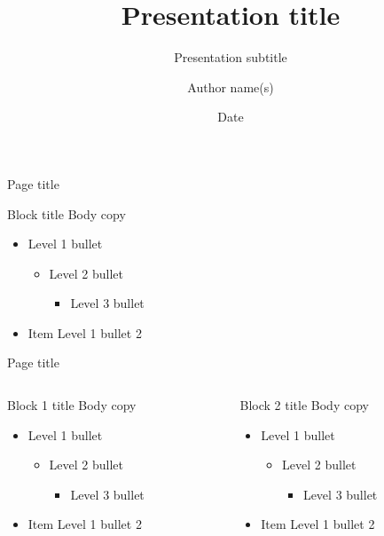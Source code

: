 \documentclass[t]{beamer}
\title{Presentation title}
\subtitle{Presentation subtitle}
\date{Date}
\author{Author name(s)}
\begin{document}
\begin{frame}
	\titlepage
\end{frame}

\begin{frame}{Page title}
	\begin{block}{Block title}
  		Body copy
  		\begin{itemize}    
  			\item Level 1 bullet
			\begin{itemize}
					\item Level 2 bullet
					\begin{itemize}
						\item Level 3 bullet
					\end{itemize}
			\end{itemize}
  			\item Item Level 1 bullet 2
  		\end{itemize}    
	\end{block}
\end{frame}

\begin{frame}{Page title}
	\begin{columns}[T,totalwidth=\textwidth]
  		\begin{column}{0.45\textwidth}
  			\begin{block}{Block 1 title}
    				Body copy
    				\begin{itemize}    
    					\item Level 1 bullet
  					\begin{itemize}
  						\item Level 2 bullet
  						\begin{itemize}
  							\item Level 3 bullet
  						\end{itemize}
  					\end{itemize}
    					\item Item Level 1 bullet 2
    				\end{itemize}  
			\end{block}
  		\end{column} %
  		\begin{column}{0.45\textwidth}
  			\begin{block}{Block 2 title}
    				Body copy
    				\begin{itemize}    
    					\item Level 1 bullet
  					\begin{itemize}
  						\item Level 2 bullet
  						\begin{itemize}
  							\item Level 3 bullet
  						\end{itemize}
  					\end{itemize}
    					\item Item Level 1 bullet 2
    				\end{itemize}  
			\end{block}
  		\end{column}%
	\end{columns}
\end{frame}
\end{document}
